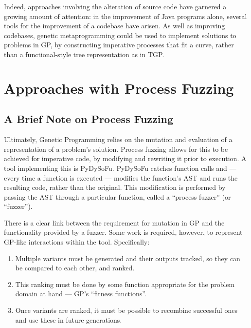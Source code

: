 \documentclass[draft,12pt]{llncs} %
\begin{document}
Indeed, approaches involving the alteration of source code have garnered a
growing amount of attention: in the improvement of Java programs alone, several
tools for the improvement of a codebase have
arisen\cite{cody2015locogp,arcuri2008multi,castle2012evolving}. As well as
improving codebases, genetic metaprogramming could be used to implement
solutions to problems in GP, by constructing imperative processes that fit a
curve, rather than a functional-style tree representation as in
TGP\cite{koza1994genetic}.\par



\section{Approaches with Process Fuzzing}

\subsection{A Brief Note on Process Fuzzing}
Ultimately, Genetic Programming relies on the mutation and evaluation of a
representation of a problem's solution. Process fuzzing allows for this to be
achieved for imperative code, by modifying and rewriting it prior to execution.
A tool implementing this is PyDySoFu\cite{pydysofu}. PyDySoFu catches function
calls and --- every time a function is executed --- modifies the function's AST
and runs the resulting code, rather than the original. This modification is
performed by passing the AST through a particular function, called a ``process
fuzzer'' (or ``fuzzer'').\par

There is a clear link between the requirement for mutation in GP and the
functionality provided by a fuzzer. Some work is required, however, to represent
GP-like interactions within the tool. Specifically:

\begin{enumerate}
\item Multiple variants must be generated and their outputs tracked, so they can
be compared to each other, and ranked.
\item This ranking must be done by some function appropriate for the problem
domain at hand --- GP's ``fitness functions''.
\item Once variants are ranked, it must be possible to recombine successful ones
and use these in future generations.
\end{enumerate}
\end{document}
